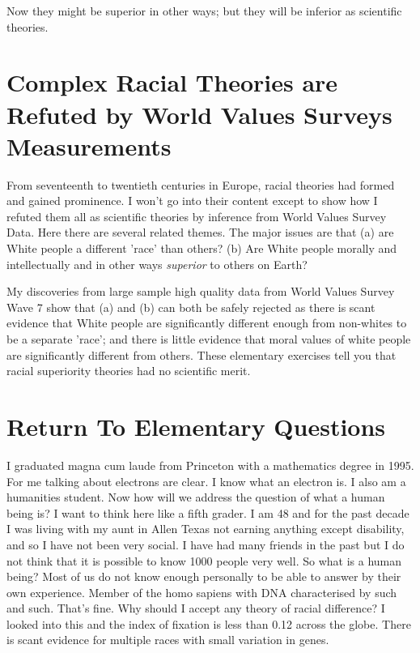 \documentclass{amsart}
\begin{document}
Now they might be superior in other ways; but they will be inferior as scientific theories. 

\section{Complex Racial Theories are Refuted by World Values Surveys Measurements}

From seventeenth to twentieth centuries in Europe, racial theories had formed and gained prominence.  I won't go into their content except to show how I refuted them all as scientific theories by inference from World Values Survey Data.  Here there are several related themes.  The major issues are that (a) are White people a different 'race' than others?  (b)  Are White people morally and intellectually and in other ways {\em superior} to others on Earth?

My discoveries from large sample high quality data from World Values Survey Wave 7 show that (a) and (b) can both be safely rejected as there is scant evidence that White people are significantly different enough from non-whites to be a separate 'race'; and there is little evidence that moral values of white people are significantly different from others.  These elementary exercises tell you that racial superiority theories had no scientific merit.

\section{Return To Elementary Questions}

I graduated magna cum laude from Princeton with a mathematics degree in 1995. For me talking about electrons are clear.  I know what an electron is.  I also am a humanities student.  Now how will we address the question of what a human being is?  I want to think here like a fifth grader.  I am 48 and for the past decade I was living with my aunt in Allen Texas not earning anything except disability, and so I have not been very social.  I have had many friends in the past but I do not think that it is possible to know 1000 people very well.  So what is a human being?  Most of us do not know enough personally to be able to answer by their own experience.  Member of the homo sapiens with DNA characterised by such and such.  That's fine.  Why should I accept any theory of racial difference?  I looked into this and the index of fixation is less than 0.12 across the globe.  There is scant evidence for multiple races with small variation in genes.
\end{document}
